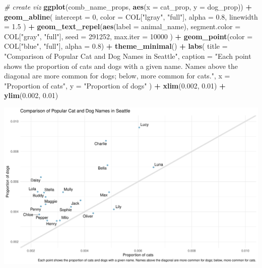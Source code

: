 \documentclass[
]{article}
\newenvironment{Shaded}{\begin{snugshade}}{\end{snugshade}}
\newcommand{\AttributeTok}[1]{\textcolor[rgb]{0.13,0.29,0.53}{#1}}
\newcommand{\CommentTok}[1]{\textcolor[rgb]{0.56,0.35,0.01}{\textit{#1}}}
\newcommand{\DecValTok}[1]{\textcolor[rgb]{0.00,0.00,0.81}{#1}}
\newcommand{\FloatTok}[1]{\textcolor[rgb]{0.00,0.00,0.81}{#1}}
\newcommand{\FunctionTok}[1]{\textcolor[rgb]{0.13,0.29,0.53}{\textbf{#1}}}
\newcommand{\NormalTok}[1]{#1}
\newcommand{\SpecialCharTok}[1]{\textcolor[rgb]{0.81,0.36,0.00}{\textbf{#1}}}
\newcommand{\StringTok}[1]{\textcolor[rgb]{0.31,0.60,0.02}{#1}}
\begin{document}
\begin{Shaded}
\begin{Highlighting}[]
\CommentTok{\# create viz}
\FunctionTok{ggplot}\NormalTok{(comb\_name\_props, }\FunctionTok{aes}\NormalTok{(}\AttributeTok{x =}\NormalTok{ cat\_prop, }\AttributeTok{y =}\NormalTok{ dog\_prop)) }\SpecialCharTok{+}
  \FunctionTok{geom\_abline}\NormalTok{(}
    \AttributeTok{intercept =} \DecValTok{0}\NormalTok{,}
    \AttributeTok{color =}\NormalTok{ COL[}\StringTok{"lgray"}\NormalTok{, }\StringTok{"full"}\NormalTok{],}
    \AttributeTok{alpha =} \FloatTok{0.8}\NormalTok{,}
    \AttributeTok{linewidth =} \FloatTok{1.5}
\NormalTok{  ) }\SpecialCharTok{+}
  \FunctionTok{geom\_text\_repel}\NormalTok{(}\FunctionTok{aes}\NormalTok{(}\AttributeTok{label =}\NormalTok{ animal\_name),}
    \AttributeTok{segment.color =}\NormalTok{ COL[}\StringTok{"gray"}\NormalTok{, }\StringTok{"full"}\NormalTok{],}
    \AttributeTok{seed =} \DecValTok{291252}\NormalTok{, }\AttributeTok{max.iter =} \DecValTok{10000}
\NormalTok{  ) }\SpecialCharTok{+}
  \FunctionTok{geom\_point}\NormalTok{(}\AttributeTok{color =}\NormalTok{ COL[}\StringTok{"blue"}\NormalTok{, }\StringTok{"full"}\NormalTok{], }\AttributeTok{alpha =} \FloatTok{0.8}\NormalTok{) }\SpecialCharTok{+}
  \FunctionTok{theme\_minimal}\NormalTok{() }\SpecialCharTok{+}
  \FunctionTok{labs}\NormalTok{(}
    \AttributeTok{title =} \StringTok{"Comparison of Popular Cat and Dog Names in Seattle"}\NormalTok{,}
    \AttributeTok{caption =} \StringTok{"Each point shows the proportion of cats and dogs with a given name. Names above the diagonal are more common for dogs; below, more common for cats."}\NormalTok{,}
    \AttributeTok{x =} \StringTok{"Proportion of cats"}\NormalTok{,}
    \AttributeTok{y =} \StringTok{"Proportion of dogs"}
\NormalTok{  ) }\SpecialCharTok{+}
  \FunctionTok{xlim}\NormalTok{(}\FloatTok{0.002}\NormalTok{, }\FloatTok{0.01}\NormalTok{) }\SpecialCharTok{+}
  \FunctionTok{ylim}\NormalTok{(}\FloatTok{0.002}\NormalTok{, }\FloatTok{0.01}\NormalTok{)}
\end{Highlighting}
\end{Shaded}

\includegraphics[width=0.8\linewidth]{hw-01-pet-names_files/figure-latex/popular_names-1}
\end{document}
